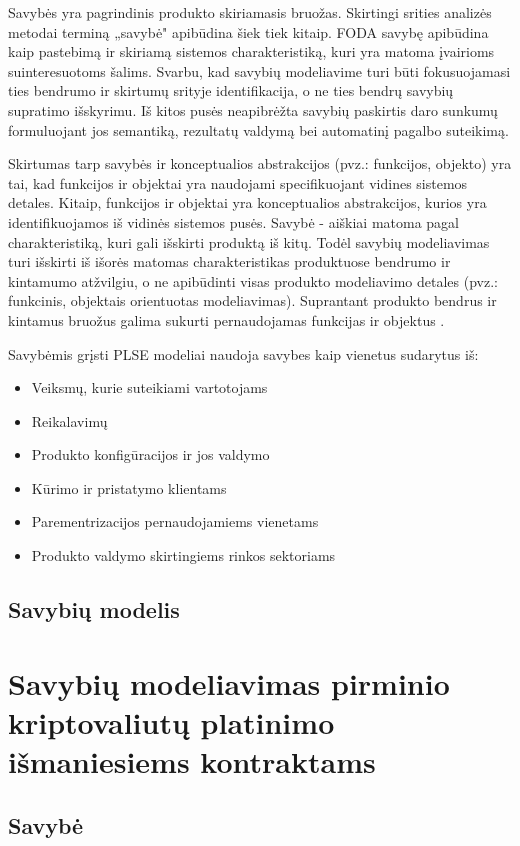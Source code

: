 \documentclass{VUMIFPSkursinis}
\begin{document}
Savybės yra pagrindinis produkto skiriamasis bruožas. Skirtingi srities analizės metodai terminą „savybė" apibūdina šiek tiek kitaip. FODA \cite{Kang1990} savybę apibūdina kaip pastebimą ir skiriamą sistemos charakteristiką, kuri yra matoma įvairioms suinteresuotoms šalims. Svarbu, kad savybių modeliavime turi būti fokusuojamasi ties bendrumo ir skirtumų srityje identifikacija, o ne ties bendrų savybių supratimo išskyrimu. Iš kitos pusės neapibrėžta savybių paskirtis daro sunkumų formuluojant jos semantiką, rezultatų valdymą bei automatinį pagalbo suteikimą.

Skirtumas tarp savybės ir konceptualios abstrakcijos (pvz.: funkcijos, objekto) yra tai, kad funkcijos ir objektai yra naudojami specifikuojant vidines sistemos detales. Kitaip, funkcijos ir objektai yra konceptualios abstrakcijos, kurios yra identifikuojamos iš vidinės sistemos pusės. Savybė - aiškiai matoma  pagal charakteristiką, kuri gali išskirti produktą iš kitų. Todėl savybių modeliavimas turi išskirti iš išorės matomas charakteristikas produktuose bendrumo ir kintamumo atžvilgiu, o ne apibūdinti visas produkto modeliavimo detales (pvz.: funkcinis, objektais orientuotas modeliavimas). Suprantant produkto bendrus ir kintamus bruožus galima sukurti pernaudojamas funkcijas ir objektus \cite{Lee2015}.

Savybėmis grįsti PLSE modeliai naudoja savybes kaip vienetus sudarytus iš:
\begin{itemize}
\item Veiksmų, kurie suteikiami vartotojams
\item Reikalavimų
\item Produkto konfigūracijos ir jos valdymo
\item Kūrimo ir pristatymo klientams 
\item Parementrizacijos pernaudojamiems vienetams
\item Produkto valdymo skirtingiems rinkos sektoriams \cite{Kang2013}
\end{itemize}
\subsection{Savybių modelis}
\section{Savybių modeliavimas pirminio kriptovaliutų platinimo išmaniesiems kontraktams}
\subsection{Savybė}
\end{document}
